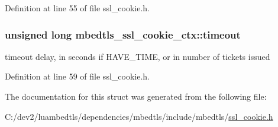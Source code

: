 Definition at line 55 of file ssl\-\_\-cookie.\-h.

\hypertarget{structmbedtls__ssl__cookie__ctx_adf87598d619f8fcf161965301c423ffb}{
\subsubsection[{timeout}]{\setlength{\rightskip}{0pt plus 5cm}unsigned long mbedtls\-\_\-ssl\-\_\-cookie\-\_\-ctx\-::timeout}}\label{structmbedtls__ssl__cookie__ctx_adf87598d619f8fcf161965301c423ffb}
timeout delay, in seconds if H\-A\-V\-E\-\_\-\-T\-I\-M\-E, or in number of tickets issued 

Definition at line 59 of file ssl\-\_\-cookie.\-h.



The documentation for this struct was generated from the following file\-:\begin{DoxyCompactItemize}
\item 
C\-:/dev2/luambedtls/dependencies/mbedtls/include/mbedtls/\hyperlink{ssl__cookie_8h}{ssl\-\_\-cookie.\-h}\end{DoxyCompactItemize}
